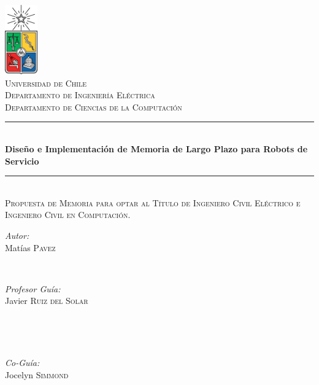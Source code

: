 \documentclass[12pt,letterpaper,spanish]{article}
\begin{document}
\begin{titlepage}

\newcommand{\HRule}{\rule{\linewidth}{0.5mm}}

\center %
 
\ \\[-1cm]
\includegraphics[height=3cm]{escudoU2014.pdf}\\[0.5cm]
\textsc{\LARGE Universidad de Chile}\\[0cm]
\textsc{\large Departamento de Ingenier\'ia El\'ectrica}\\
\textsc{\large Departamento de Ciencias de la Computaci\'on}\\[3cm]

\HRule \\[0.4cm]
{ \huge \bfseries Dise\~no e Implementaci\'on de Memoria de Largo Plazo para Robots de Servicio}\\[0.1cm] %
\HRule \\[0.5cm]

\textsc{\large Propuesta de Memoria para optar al T\'itulo de Ingeniero Civil El\'ectrico e Ingeniero Civil en Computaci\'on.}\\[1cm]

\begin{minipage}{0.4\textwidth}
\begin{flushleft} \large
\emph{Autor:}\\
Mat\'ias \textsc{Pavez} %
\end{flushleft}
\end{minipage}
~
\begin{minipage}{0.4\textwidth}
\begin{flushright} \large
\emph{Profesor Gu\'ia:} \\
Javier \textsc{Ruiz del Solar} %
\end{flushright}
\end{minipage}\\[1cm]

\begin{minipage}{0.4\textwidth}
\begin{flushleft}\end{flushleft}
\end{minipage}
~
\begin{minipage}{0.4\textwidth}
\begin{flushright} \large
\emph{Co-Gu\'ia:} \\
Jocelyn \textsc{Simmond} %
\end{flushright}
\end{minipage}\\[2.5cm]


\end{titlepage}
\end{document}
